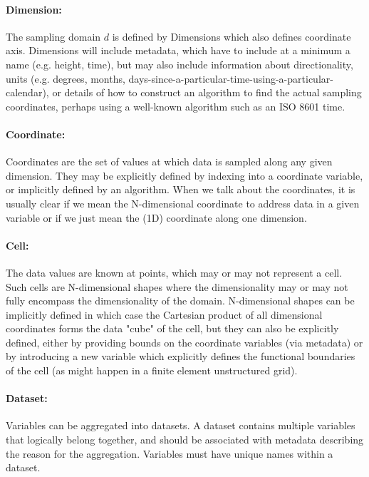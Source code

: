 \paragraph{Dimension:} The sampling domain $d$ is defined by Dimensions which also defines coordinate axis. Dimensions will include metadata, which have to include at a minimum a name (e.g. height, time), but may also include information about directionality, units (e.g. degrees, months, days-since-a-particular-time-using-a-particular-calendar), or details of how to construct an algorithm to find the actual sampling coordinates, perhaps using a well-known algorithm such as an ISO 8601 time.

\paragraph{Coordinate:} Coordinates  are the set of values at which data is sampled along any given dimension. They may be
explicitly defined by indexing into a coordinate variable, or implicitly defined by an algorithm. When we talk about the coordinates, it is usually clear if we mean the N-dimensional coordinate to address data in a given variable or if we just mean the (1D) coordinate along one dimension.


\paragraph{Cell:} The data values are known at points, which may or may not represent a cell. Such cells are N-dimensional shapes where the dimensionality may or may not fully encompass the dimensionality of the domain.
N-dimensional shapes can be implicitly defined in which case the Cartesian product of all dimensional coordinates forms the data "cube" of the cell, but they can also be explicitly defined, either by providing bounds on the coordinate variables (via metadata) or by introducing a new variable which explicitly defines the functional boundaries of the cell (as might happen in a finite element unstructured grid).


\paragraph{Dataset:} Variables can be aggregated into datasets. A dataset contains multiple variables that logically belong together, and should be associated with metadata describing the reason for the aggregation.  Variables must have unique names within a dataset.



